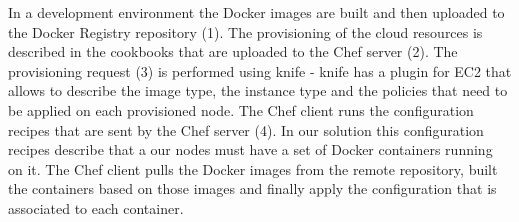 In a development environment the Docker images are built and then uploaded to the Docker Registry
repository (1). The provisioning of the cloud resources is described in the cookbooks that are uploaded
to the Chef server (2). The provisioning request (3) is performed using knife - knife has a plugin for EC2
that allows to describe the image type, the instance type and the policies that need to be applied on
each provisioned node. The Chef client runs the configuration recipes that are sent by the Chef server (4).
In our solution this configuration recipes describe that a our nodes must have a set of Docker containers
running on it. The Chef client pulls the Docker images from the remote repository, built the
containers based on those images and finally apply the configuration that is associated to each container.   
